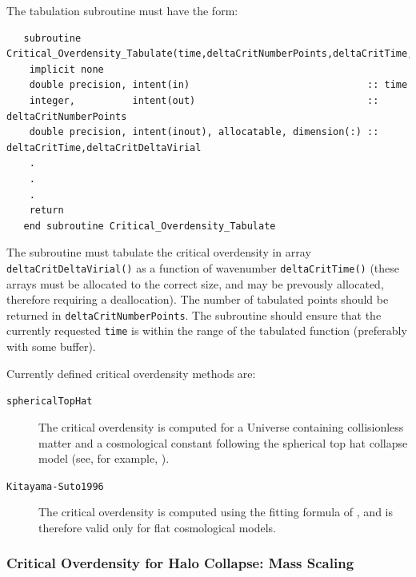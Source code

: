 The tabulation subroutine must have the form:
\begin{verbatim}
   subroutine Critical_Overdensity_Tabulate(time,deltaCritNumberPoints,deltaCritTime,deltaCritDeltaCrit)
    implicit none
    double precision, intent(in)                               :: time
    integer,          intent(out)                              :: deltaCritNumberPoints
    double precision, intent(inout), allocatable, dimension(:) :: deltaCritTime,deltaCritDeltaVirial
    .
    .
    .
    return
   end subroutine Critical_Overdensity_Tabulate
\end{verbatim}
The subroutine must tabulate the critical overdensity in array {\tt deltaCritDeltaVirial()} as a function of wavenumber {\tt deltaCritTime()} (these arrays must be allocated to the correct size, and may be prevously allocated, therefore requiring a deallocation). The number of tabulated points should be returned in {\tt deltaCritNumberPoints}. The subroutine should ensure that the currently requested {\tt time} is within the range of the tabulated function (preferably with some buffer).

Currently defined critical overdensity methods are:
\begin{description}
 \item [{\tt sphericalTopHat}] The critical overdensity is computed for a Universe containing collisionless matter and a cosmological constant following the spherical top hat collapse model (see, for example, \citealt{percival_cosmological_2005}).
 \item [{\tt Kitayama-Suto1996}] The critical overdensity is computed using the fitting formula of \cite{kitayama_semianalytic_1996}, and is therefore valid only for flat cosmological models.
\end{description}

\subsubsection{Critical Overdensity for Halo Collapse: Mass Scaling}

